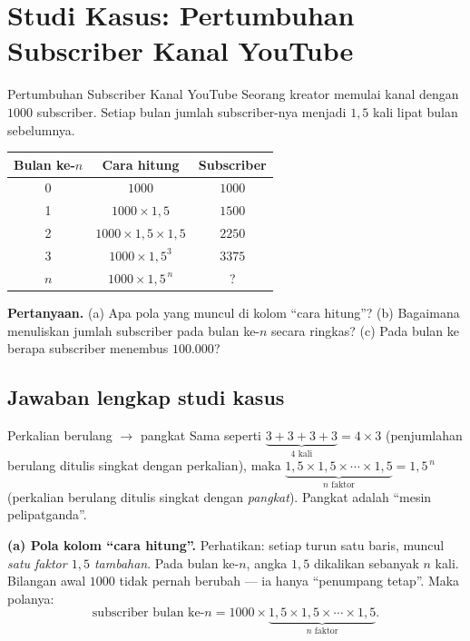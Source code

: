\documentclass[11pt,a4paper]{report}
\theoremstyle{gaya}
\begin{document}
\section*{Studi Kasus: Pertumbuhan Subscriber Kanal YouTube}

\begin{studikasus}{Pertumbuhan Subscriber Kanal YouTube}
Seorang kreator memulai kanal dengan $1000$ subscriber. Setiap bulan jumlah
subscriber-nya menjadi $1{,}5$ kali lipat bulan sebelumnya.

\smallskip
\begin{center}
\begin{tabular}{c|c|c}
\toprule
Bulan ke-$n$ & Cara hitung & Subscriber \\
\midrule
0 & $1000$ & $1000$\\
1 & $1000 \times 1{,}5$ & $1500$\\
2 & $1000 \times 1{,}5 \times 1{,}5$ & $2250$\\
3 & $1000 \times 1{,}5^3$ & $3375$\\
$n$ & $1000 \times 1{,}5^{\,n}$ & ? \\
\bottomrule
\end{tabular}
\end{center}

\smallskip
\textbf{Pertanyaan.} (a) Apa pola yang muncul di kolom ``cara hitung''?
(b) Bagaimana menuliskan jumlah subscriber pada bulan ke-$n$ secara ringkas?
(c) Pada bulan ke berapa subscriber menembus $100.000$?
\end{studikasus}

\subsection*{Jawaban lengkap studi kasus}

\begin{ingat}{Perkalian berulang $\to$ pangkat}
Sama seperti $\underbrace{3+3+3+3}_{4\text{ kali}} = 4\times 3$ (penjumlahan berulang
ditulis singkat dengan perkalian), maka
$\underbrace{1{,}5\times 1{,}5\times \cdots \times 1{,}5}_{n\text{ faktor}} = 1{,}5^{\,n}$
(perkalian berulang ditulis singkat dengan \emph{pangkat}). Pangkat adalah
``mesin pelipatganda''.
\end{ingat}

\textbf{(a) Pola kolom ``cara hitung''.} Perhatikan: setiap turun satu baris,
muncul \emph{satu faktor $1{,}5$ tambahan}. Pada bulan ke-$n$, angka $1{,}5$
dikalikan sebanyak $n$ kali. Bilangan awal $1000$ tidak pernah berubah --- ia
hanya ``penumpang tetap''. Maka polanya:
\[
\text{subscriber bulan ke-}n = 1000 \times \underbrace{1{,}5\times1{,}5\times\cdots\times1{,}5}_{n\text{ faktor}}.
\]
\end{document}
